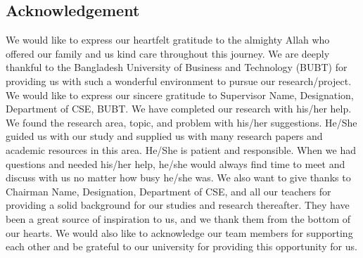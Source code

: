 \begin{center}
    \section*{Acknowledgement}
\end{center}
\large We would like to express our heartfelt gratitude to the almighty Allah who offered our family and us kind care throughout this journey. We are deeply thankful to the Bangladesh University of Business and Technology (BUBT) for providing us with such a wonderful environment to pursue our research/project. We would like to express our sincere gratitude to Supervisor Name, Designation, Department of CSE, BUBT. We have completed our research with his/her help. We found the research area, topic, and problem with his/her suggestions. He/She guided us with our study and supplied us with many research papers and academic resources in this area. He/She is patient and responsible. When we had questions and needed his/her help, he/she would always find time to meet and discuss with us no matter how busy he/she was. We also want to give thanks to Chairman Name, Designation, Department of CSE, and all our teachers for providing a solid background for our studies and research thereafter. They have been a great source of inspiration to us, and we thank them from the bottom of our hearts. We would also like to acknowledge our team members for supporting each other and be grateful to our university for providing this opportunity for us.